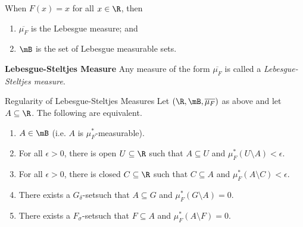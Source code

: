 \documentclass[pmath451]{subfiles}
\begin{document}
    \begin{theorem}{}
        When $F\left( x \right) = x$ for all $x\in\R$, then
        \begin{enumerate}
            \item $\overline{\mu_F}$ is the Lebesgue measure; and
            \item $\mB$ is the set of Lebesgue measurable sets.
        \end{enumerate}
    \end{theorem}

    \rruleline

    \begin{definition}{\textbf{Lebesgue-Steltjes Measure}}
        Any measure of the form $\overline{\mu_F}$ is called a \emph{Lebesgue-Steltjes measure}.
    \end{definition}

    \begin{theorem}{Regularity of Lebesgue-Steltjes Measures}
        Let $\left( \R,\mB,\overline{\mu_F} \right)$ as above and let $A\subseteq\R$. The following are equivalent.
        \begin{enumerate}
            \item $A\in\mB$ (i.e. $A$ is $\mu_F^{*}$-measurable).
            \item For all $\epsilon>0$, there is open $U\subseteq\R$ such that $A\subseteq U$ and $\mu_F^{*}\left( U\setminus A \right) < \epsilon$.
            \item For all $\epsilon>0$, there is closed $C\subseteq\R$ such that $C\subseteq A$ and $\mu_F^{*}\left( A\setminus C \right) < \epsilon$.
            \item There exists a $G_{\delta}$-set\footnotemark[1] such that $A\subseteq G$ and $\mu_F^{*}\left( G\setminus A \right) = 0$.
            \item There exists a $F_{\sigma}$-set\footnotemark[2] such that $F\subseteq A$ and $\mu_F^{*}\left( A\setminus F \right) = 0$.
        \end{enumerate}
        
        \noindent
        \begin{minipage}{\textwidth}
        \end{minipage}
    \end{theorem}
    
\end{document}
